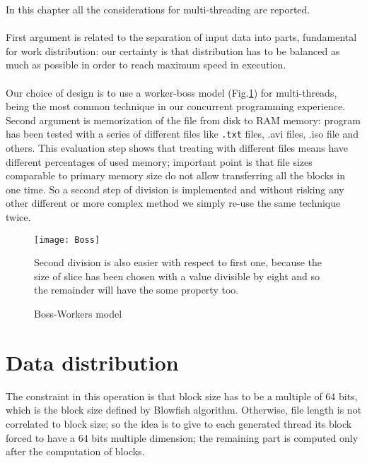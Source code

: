 In this chapter all the considerations for multi-threading are reported.
\\
\\
First argument is related to the separation of input data into parts, fundamental for work distribution: our certainty is that distribution has to be balanced as much as possible in order to reach maximum speed in execution. 
\\
\\
Our choice of design is to use a worker-boss model (Fig.\ref{Fig:Boss}) for multi-threads, being the most common technique in our concurrent programming experience. Second argument is memorization of the file from disk to RAM memory: program has been tested with a series of different files like \texttt{.txt} files, .avi files, .iso file and others. This evaluation step shows that treating with different files means have different percentages of used memory; important point is that file sizes comparable to primary memory size do not allow transferring all the blocks in one time. So a second step of division is implemented and without risking any other different or more complex method we simply re-use the same technique twice.
\begin{figure}[!h]
\begin{center}
 \texttt{[image: Boss]}
 \caption{Boss-Workers model}
 \label{Fig:Boss}
 \end{center}
Second division is also easier with respect to first one, because the size of slice has been chosen with a value divisible by eight and so the remainder will have the some property too.
 \end{figure}
 
\section{Data distribution}
The constraint in this operation is that block size has to be a multiple of 64 bits, which is the block size defined by Blowfish algorithm. Otherwise, file length is not correlated to block size; so the idea is to give to each generated thread its block forced to have a 64 bits multiple dimension; the remaining part is computed only after the computation of blocks.
